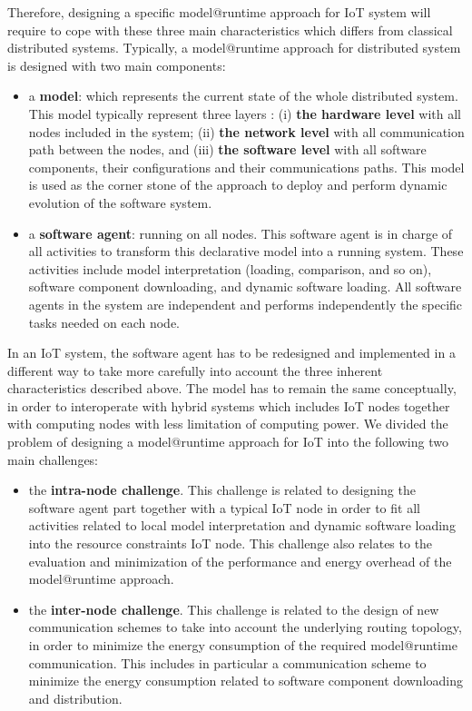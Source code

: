 Therefore, designing a specific model@runtime approach for IoT system will require to cope with these three main characteristics which differs from classical distributed systems. 
Typically, a model@runtime approach for distributed system is designed with two main components:
\begin{itemize}
	\item a \textbf{model}: which represents the current state of the whole distributed system. This model typically represent three layers : (i) \textbf{the hardware level} with all nodes included in the system; (ii) \textbf{the network level} with all communication path between the nodes, and (iii) \textbf{the software level} with all software components, their configurations and their communications paths. This model is used as the corner stone of the approach to deploy and perform dynamic evolution of the software system.
	\item a \textbf{software agent}: running on all nodes. This software agent is in charge of all activities to transform this declarative model into a running system. These activities include model interpretation (loading, comparison, and so on), software component downloading, and dynamic software loading. All software agents in the system are independent and performs independently the specific tasks needed on each node.
\end{itemize}

In an IoT system, the software agent has to be redesigned and implemented in a different way to take more carefully into account the three inherent characteristics described above.
The model has to remain the same conceptually, in order to interoperate with hybrid systems which includes IoT nodes together with computing nodes with less limitation of computing power. 
We divided the problem of designing a model@runtime approach for IoT into the following two main challenges:
\begin{itemize}
	\item the \textbf{intra-node challenge}. This challenge is related to designing the software agent part together with a typical IoT node in order to fit all activities related to local model interpretation and dynamic software loading into the resource constraints IoT node. This challenge also relates to the evaluation and minimization of the performance and energy overhead of the model@runtime approach. 
	\item the \textbf{inter-node challenge}. This challenge is related to the design of new communication schemes to take into account the underlying routing topology, in order to minimize the energy consumption of the required model@runtime communication. This includes in particular a communication scheme to minimize the energy consumption related to software component downloading and distribution.
\end{itemize}

